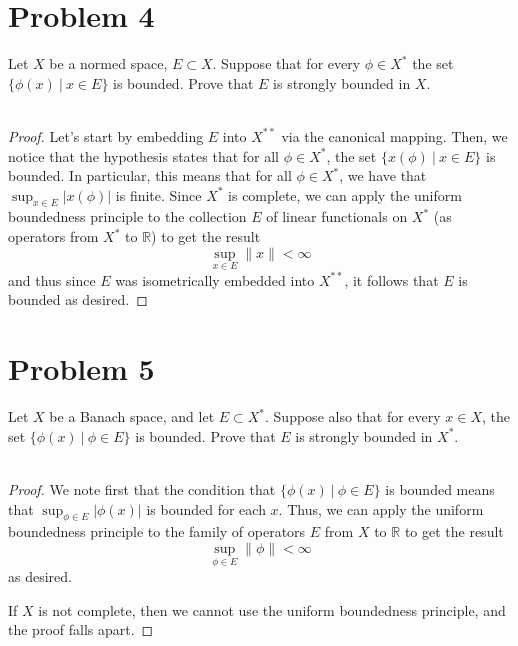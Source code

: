 \documentclass[fontsize=11pt]{scrartcl} %
\numberwithin{equation}{section} %
\numberwithin{figure}{section} %
\numberwithin{table}{section} %
\newcommand{\R}{\mathbb{R}}
\begin{document}
\newpage
\section*{Problem 4}
Let $X$ be a normed space, $E\subset X$. Suppose that for every $\phi\in X^*$
the set $\{\phi(x)\ |\ x\in E\}$ is bounded. Prove that $E$ is strongly bounded
in $X$.
\\
\\
\begin{proof}
    Let's start by embedding $E$ into $X^{**}$ via the canonical mapping. Then,
    we notice that the hypothesis states that for all $\phi\in X^*$, the set
    $\{x(\phi)\ |\ x\in E\}$ is bounded. In particular, this means that for all
    $\phi\in X^*$, we have that $\sup_{x\in E} |x(\phi)|$ is finite. Since $X^*$
    is complete, we can apply the uniform boundedness principle to the
    collection $E$ of linear functionals on $X^*$ (as operators from $X^*$ to
    $\R$) to get the result
    \[
        \sup_{x\in E}\|x\| < \infty
    \]
    and thus since $E$ was isometrically embedded into $X^{**}$, it follows that
    $E$ is bounded as desired.
\end{proof}

\newpage
\section*{Problem 5}
Let $X$ be a Banach space, and let $E\subset X^*$. Suppose also that for every
$x\in X$, the set $\{\phi(x)\ |\ \phi\in E\}$ is bounded. Prove that $E$ is
strongly bounded in $X^*$.
\\
\\
\begin{proof}
    We note first that the condition that $\{\phi(x)\ |\ \phi\in E\}$ is bounded
    means that $\sup_{\phi\in E} |\phi(x)|$ is bounded for each $x$. Thus, we
    can apply the uniform boundedness principle to the family of operators $E$
    from $X$ to $\R$ to get the result
    \[
        \sup_{\phi\in E} \|\phi\|<\infty
    \]
    as desired.

    If $X$ is not complete, then we cannot use the uniform boundedness
    principle, and the proof falls apart.
\end{proof}

\newpage
\end{document}
